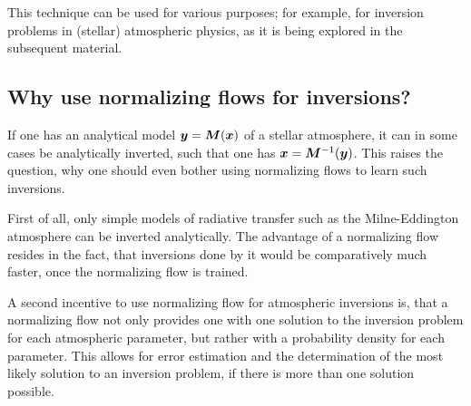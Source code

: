 \documentclass[a4paper,12pt]{report}
\def\lk#1{{\color{black}{#1}}}
\begin{document}
This technique can be used for various purposes; for example, for inversion problems in (stellar) atmospheric physics, as it is being explored in the subsequent material.

%

\subsection{Why use normalizing flows for inversions?}
If one has an analytical model $\bm{y} = \bm{M}(\bm{x})$ of a stellar atmosphere, it can in some cases be analytically inverted, such that one has $\bm{x} = \bm{M}^{-1}(\bm{y})$. This raises the question, why one should even bother using normalizing flows to learn such inversions.

First of all, only simple models of radiative transfer such as the Milne-Eddington atmosphere can be inverted analytically. \lk{More complex models require resource-demanding numerical calculations to do inversions.} The advantage of a normalizing flow resides in the fact, that inversions done by it would be comparatively much faster, once the normalizing flow is trained.

A second incentive to use normalizing flow for atmospheric inversions is, that a normalizing flow not only provides one with one solution to the inversion problem for each atmospheric parameter, but rather with a probability density for each parameter. This allows for error estimation and the determination of the most likely solution to an inversion problem, if there is more than one solution possible.
\end{document}
